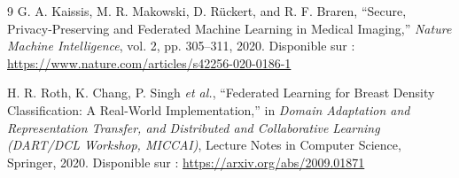 \documentclass[12pt,a4paper]{report}
\begin{document}
\begin{thebibliography}{9}
G. A. Kaissis, M. R. Makowski, D. Rückert, and R. F. Braren,
``Secure, Privacy-Preserving and Federated Machine Learning in Medical Imaging,''
\textit{Nature Machine Intelligence}, vol. 2, pp. 305--311, 2020.
Disponible sur : \url{https://www.nature.com/articles/s42256-020-0186-1}

H. R. Roth, K. Chang, P. Singh \textit{et al.},
``Federated Learning for Breast Density Classification: A Real-World Implementation,''
in \textit{Domain Adaptation and Representation Transfer, and Distributed and Collaborative Learning (DART/DCL Workshop, MICCAI)}, Lecture Notes in Computer Science, Springer, 2020.
Disponible sur : \url{https://arxiv.org/abs/2009.01871}

\end{thebibliography}
\end{document}
